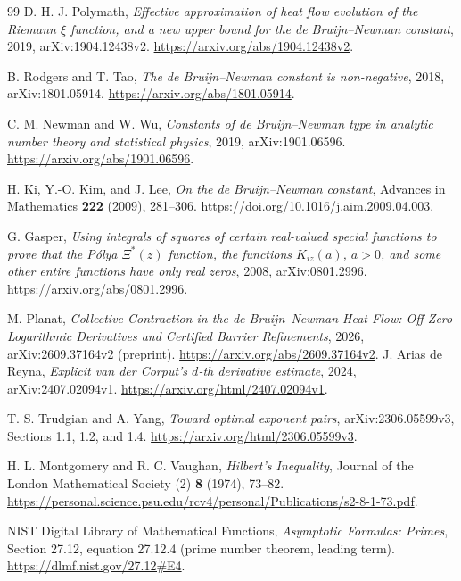 \documentclass[11pt]{article}
\numberwithin{equation}{section}
\theoremstyle{definition}
\theoremstyle{remark}
\begin{document}
\begin{thebibliography}{99}
D. H. J. Polymath,
\emph{Effective approximation of heat flow evolution of the Riemann
$\xi$ function, and a new upper bound for the de Bruijn--Newman constant},
2019, arXiv:1904.12438v2.
\url{https://arxiv.org/abs/1904.12438v2}.

B. Rodgers and T. Tao,
\emph{The de Bruijn--Newman constant is non-negative},
2018, arXiv:1801.05914.
\url{https://arxiv.org/abs/1801.05914}.

C. M. Newman and W. Wu,
\emph{Constants of de Bruijn--Newman type in analytic number theory
and statistical physics}, 2019, arXiv:1901.06596.
\url{https://arxiv.org/abs/1901.06596}.

H. Ki, Y.-O. Kim, and J. Lee,
\emph{On the de Bruijn--Newman constant},
Advances in Mathematics \textbf{222} (2009), 281--306.
\url{https://doi.org/10.1016/j.aim.2009.04.003}.

G. Gasper,
\emph{Using integrals of squares of certain real-valued special functions
to prove that the P\'olya $\Xi^*(z)$ function, the functions $K_{iz}(a)$,
$a>0$, and some other entire functions have only real zeros},
2008, arXiv:0801.2996.
\url{https://arxiv.org/abs/0801.2996}.

M. Planat,
\emph{Collective Contraction in the de Bruijn--Newman Heat Flow:
Off-Zero Logarithmic Derivatives and Certified Barrier Refinements},
2026, arXiv:2609.37164v2 (preprint).
\url{https://arxiv.org/abs/2609.37164v2}.
J. Arias de Reyna,
\emph{Explicit van der Corput's $d$-th derivative estimate},
2024, arXiv:2407.02094v1.
\url{https://arxiv.org/html/2407.02094v1}.

T. S. Trudgian and A. Yang,
\emph{Toward optimal exponent pairs}, arXiv:2306.05599v3,
Sections 1.1, 1.2, and 1.4.
\url{https://arxiv.org/html/2306.05599v3}.

H. L. Montgomery and R. C. Vaughan,
\emph{Hilbert's Inequality},
Journal of the London Mathematical Society (2) \textbf{8} (1974), 73--82.
\url{https://personal.science.psu.edu/rcv4/personal/Publications/s2-8-1-73.pdf}.

NIST Digital Library of Mathematical Functions,
\emph{Asymptotic Formulas: Primes}, Section 27.12, equation 27.12.4
(prime number theorem, leading term).
\url{https://dlmf.nist.gov/27.12\#E4}.

\end{thebibliography}
\end{document}
